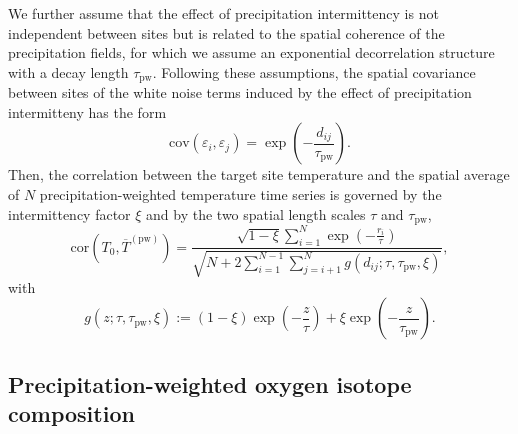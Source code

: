 \documentclass[cp, manuscript]{copernicus}
\begin{document}
We further assume that the effect of precipitation intermittency is not
independent between sites but is related to the spatial coherence of the
precipitation fields, for which we assume an exponential decorrelation structure
with a decay length $\tau_{\mathrm{pw}}$. Following these assumptions, the
spatial covariance between sites of the white noise terms induced by the effect
of precipitation intermitteny has the form
%
\begin{equation}
\label{eq:noise.cov}
\mathrm{cov}(\varepsilon_i,\varepsilon_j)=
\exp{\left(-\frac{d_{ij}}{\tau_{\mathrm{pw}}}\right)}.
\end{equation}
%
Then, the correlation between the target site temperature and the spatial
average of $N$ precipitation-weighted temperature time series is governed by the
intermittency factor $\xi$ and by the two spatial length scales $\tau$ and
$\tau_{\mathrm{pw}}$,
%
\begin{equation}
\label{eq:t2m.pw.corr}
\mathrm{cor}\left(T_0,\overline{T}^{\mathrm{(pw)}}\right)=
\frac
{\sqrt{1-\xi}\sum_{i=1}^{N}\exp{\left(-\frac{r_i}{\tau}\right)}}
{\sqrt{N + 2\sum_{i=1}^{N-1}\sum_{j=i+1}^{N}
  g(d_{ij}; \tau, \tau_{\mathrm{pw}}, \xi)}},
\end{equation}
%
with
\begin{equation}
\label{eq:exp.fun}
g(z; \tau, \tau_{\mathrm{pw}}, \xi):=
(1-\xi)\exp{\left(-\frac{z}{\tau}\right)} +
\xi\exp{\left(-\frac{z}{\tau_{\mathrm{pw}}}\right)}.
\end{equation}

\subsection{Precipitation-weighted oxygen isotope composition}
\label{app:concept.model.oxy.pw}
\end{document}

